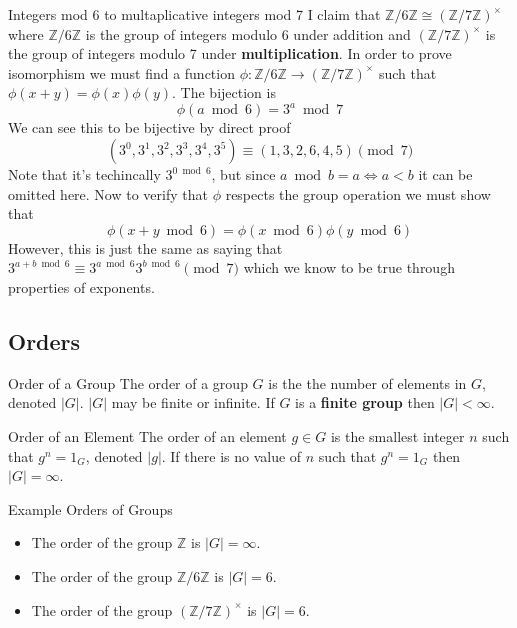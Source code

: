 \begin{example}{Integers mod 6 to multaplicative integers mod 7}{} I claim that $\mathbb{Z}/6\mathbb{Z} \cong (\mathbb{Z}/7\mathbb{Z})^{\times}$ where $\mathbb{Z}/6\mathbb{Z}$ is the group of integers modulo 6 under addition and $(\mathbb{Z}/7\mathbb{Z})^{\times}$ is the group of integers modulo 7 under \textbf{multiplication}. In order to prove isomorphism we must find a function $\phi: \mathbb{Z}/6\mathbb{Z} \to (\mathbb{Z}/7\mathbb{Z})^{\times}$ such that $\phi(x + y) = \phi(x)\phi(y)$. The bijection is
	\begin{equation*}
		\phi(a \bmod 6) = 3^{a} \bmod{7}
	\end{equation*}
	We can see this to be bijective by direct proof
	\begin{equation*}
		(3^0, 3^1, 3^2, 3^3, 3^4, 3^5) \equiv (1, 3, 2, 6, 4, 5) \pmod{7}
	\end{equation*}
	Note that it's techincally $3^{0 \bmod 6}$, but since $a \bmod b = a \Leftrightarrow a < b$ it can be omitted here. Now to verify that $\phi$ respects the group operation we must show that
	\begin{equation*}
		\phi(x+y \bmod 6) = \phi(x\bmod 6)\phi(y\bmod 6)
	\end{equation*}
	However, this is just the same as saying that $\displaystyle 3^{a+b\bmod 6} \equiv 3^{a \bmod 6}3^{b \bmod 6} \pmod{7}$ which we know to be true through properties of exponents.
\end{example}

\subsection{Orders}
\begin{definition}{Order of a Group}{} The order of a group $G$ is the the number of elements in $G$, denoted $|G|$. $|G|$ may be finite or infinite. If $G$ is a \textbf{finite group} then $|G| < \infty$.
\end{definition}
\begin{definition}{Order of an Element}{} The order of an element $g \in G$ is the smallest integer $n$ such that $g^{n} = 1_G$, denoted $|g|$. If there is no value of $n$ such that $g^{n} = 1_{G}$ then $|G|=\infty$.
\end{definition}

\begin{example}{Example Orders of Groups}{}
    \begin{itemize}
        \item The order of the group $\mathbb{Z}$ is $|G| = \infty$.
        \item The order of the group $\mathbb{Z}/6\mathbb{Z}$ is $|G| = 6$.
        \item The order of the group $(\mathbb{Z}/7\mathbb{Z})^{\times}$ is $|G| = 6$.
    \end{itemize}
\end{example}

